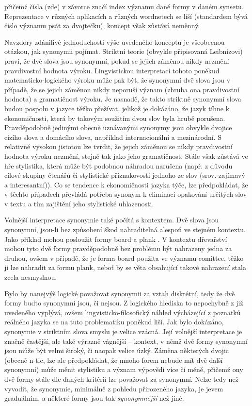 \documentclass[a4paper, 11pt, oneside]{book}
\newcommand{\td}[2][]{
	{\todo[size=\footnotesize]{#2}}
}
\newcommand\ex{\textsf}
\begin{document}
					přičemž čísla (zde) v závorce značí index významu dané formy v daném synsetu. Reprezentace v různých aplikacích a různých wordnetech se liší (standardem bývá číslo významu psát za dvojtečku), koncept však zůstává neměnný. 

					Navzdory zdánilivé jednoduchosti výše uvedeného konceptu je všeobecnou otázkou, jak synonymii pojímat. Striktní teorie (obvykle připisovaná Leibnizovi) praví, že dvě slova jsou synonymní, pokud se jejich záměnou nikdy nezmění pravdivostní hodnota výroku. Lingvistickou interpretací tohoto poněkud matematicko-logického výroku může pak být, že synonymní dvě slova jsou v případě, že se jejich záměnou nikdy neporuší význam (zhruba ona pravdivostní hodnota) a gramatičnost výroku. Je nasnadě, že takto striktně synonymní slova budou pospolu v jazyce těžko přežívat, jelikož je dokázáno, že jazyk tíhne k ekonomičnosti, která by takovým soužitím dvou slov byla hrubě porušena. Pravděpodobně jedinými obecně uznávanými synonymy jsou obvykle dvojice cizího slova a domácího slova, například \ex{internacionální} a \ex{mezinárodní}. S relativně vysokou jistotou lze tvrdit, že jejich záměnou se nikdy pravdivostní hodnota výroku nezmění, stejně tak jako jeho gramatičnost. Stále však zůstává ve hře stylistika, která může být podobnou náhradou narušena (např. z důvodu cílové skupiny čtenářů či stylistické příznakovosti jednoho ze slov (srov. \ex{zajímavý} a \ex{interesantní})). Co se tendence k ekonomičnosti jazyka týče, lze předpokládat, že v těchto případech převládá potřeba synonym k eliminaci opakování určitých slov v textu a tím zajištění jeho stylistické uhlazenosti. 

					Volnější interpretace synonymie také počítá s kontextem. Dvě slova jsou synonymní, jsou-li bez způsobení škod nahraditelná alespoň ve stejném kontextu. Jako příklad mohou posloužit formy \ex{board} a \ex{plank}\td{najit ceske priklady}. V kontextu dřevařství mohou tyto dvě formy pravděpodobně bez problému být nahrazeny jedna za druhou, ovšem v případě, že je forma \ex{board} použita ve významu \ex{comittee}, těžko ji lze nahradit za formu \ex{plank}, neboť by se věta obsahující takové nahrazení stala zcela nesmyslnou.

					Bylo by nanejvýš logické považovat synonymii za vztah diskrétní, tedy že dvě formy buďto synonymní jsou, či nejsou. Z logického hlediska to nepochybně z již uvedeného vyplývá, ovšem lingvisticko-filosofický náhled výcházející z poznatků reálného jazyka se na tuto problematiku poněkud liší. Jak bylo dokázáno, synonymie v striktním slova smyslu je velice vzácná. Její volnější interpretace je značně častější, ale také výrazně vágnější -- kontext, v němž dvě formy synonymní jsou může být velmi široký, či naopak velice úzký. Záměna některých dvojic (obecně n-tic, lze ale předpokládat, že mnoho forem nebude mít dvě další synonymní) může měnit stylistiku a význam výpovědi více či méně, přičemž ony dvě formy stále dle daných kritérií lze považovat za synonymní. Nelze tedy než vyvodit, že synonymie, minimálně z pohledu přirozeného jazyka, je jevem graduálním, a některé formy jsou tak \textit{synonymnější} než jiné.
\end{document}
